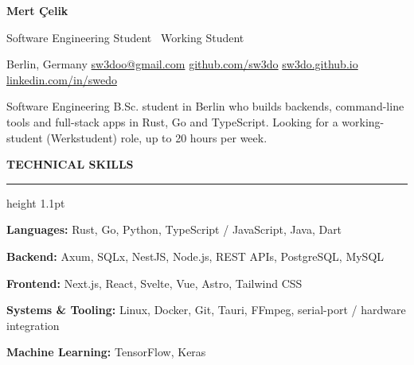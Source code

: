 \documentclass[a4paper,11pt]{article}
\newcommand{\cvsection}[1]{%
  \vspace{9pt}%
  {\color{accent}\large\bfseries\MakeUppercase{#1}}\par\vspace{2pt}%
  {\color{accent}\hrule height 1.1pt}\vspace{5pt}%
}
\begin{document}
\begin{center}
  {\Huge\bfseries Mert \textcolor{accent}{Çelik}}\par\vspace{4pt}
  {\color{muted}Software Engineering Student \textbar\ Working Student}\par\vspace{4pt}
  \small Berlin, Germany \quad\textbar\quad
  \href{mailto:sw3doo@gmail.com}{sw3doo@gmail.com} \quad\textbar\quad
  \href{https://github.com/sw3do}{github.com/sw3do} \quad\textbar\quad
  \href{https://sw3do.github.io}{sw3do.github.io} \quad\textbar\quad
  \href{https://linkedin.com/in/swedo}{linkedin.com/in/swedo}
\end{center}

\vspace{6pt}
\small Software Engineering B.Sc. student in Berlin who builds backends, command-line tools and full-stack apps in Rust, Go and TypeScript. Looking for a working-student (Werkstudent) role, up to 20 hours per week.

\cvsection{Technical Skills}
\small
\textbf{Languages:} Rust, Go, Python, TypeScript / JavaScript, Java, Dart \par
\textbf{Backend:} Axum, SQLx, NestJS, Node.js, REST APIs, PostgreSQL, MySQL \par
\textbf{Frontend:} Next.js, React, Svelte, Vue, Astro, Tailwind CSS \par
\textbf{Systems \& Tooling:} Linux, Docker, Git, Tauri, FFmpeg, serial-port / hardware integration \par
\textbf{Machine Learning:} TensorFlow, Keras \par
\end{document}
